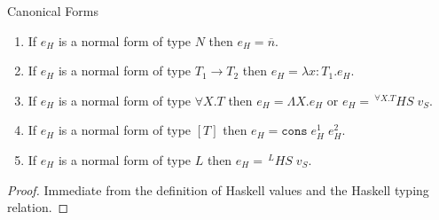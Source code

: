 \begin{lemma}
\label{hcf}
Canonical Forms
\begin{enumerate}
\item If $e_{H}$ is a normal form of type $N$ then $e_{H}=\overline{n}$.
\item If $e_{H}$ is a normal form of type $T_{1}\rightarrow T_{2}$ then $e_{H}=\lambda x:T_{1}.e_{H}$.
\item If $e_{H}$ is a normal form of type $\forall X.T$ then $e_{H}=\Lambda X.e_{H}$ or $e_{H}=\,^{\forall X.T}HS\;v_{S}$.
\item If $e_{H}$ is a normal form of type $[T]$ then $e_{H}=\mathtt{cons}\;e_{H}^{1}\;e_{H}^{2}$.
\item If $e_{H}$ is a normal form of type $L$ then $e_{H}=\,^{L}HS\;v_{S}$.
\end{enumerate}
\begin{proof}
Immediate from the definition of Haskell values and the Haskell typing relation.
\end{proof}
\end{lemma}